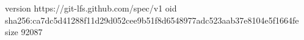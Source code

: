 version https://git-lfs.github.com/spec/v1
oid sha256:ca7dc5d41288f11d29d052cee9b51f8d6548977adc523aab37e8104e5f1664fe
size 92087
